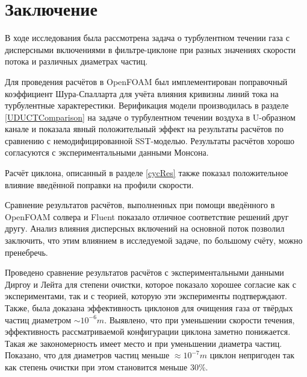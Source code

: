 \section*{Заключение}

В ходе исследования была рассмотрена задача о турбулентном течении газа с дисперсными включениями в фильтре-циклоне при разных значениях скорости потока и различных диаметрах частиц.

Для проведения расчётов в OpenFOAM был имплементирован поправочный коэффициент Шура-Спалларта для учёта влияния кривизны линий тока на турбулентные характерестики. Верификация модели производилась в разделе \ref{UDUCTComparison} на задаче о турбулентном течении воздуха в U-образном канале и показала явный положительный эффект на результаты расчётов по сравнению с немодифицированной SST-моделью. Результаты расчётов хорошо согласуются с экспериментальными данными Монсона.

Расчёт циклона, описанный в разделе \ref{cycRes} также показал положительное влияние введённой поправки на профили скорости. 

Сравнение результатов расчётов, выполненных при помощи введённого в OpenFOAM солвера и Fluent показало отличное соответствие решений друг другу. Анализ влияния дисперсных включений на основной поток позволил заключить, что этим влиянием в исследуемой задаче, по большому счёту, можно пренебречь.

Проведено сравнение результатов расчётов с экспериментальными данными Диргоу и Лейта для степени очистки, которое показало хорошее согласие как с экспериментами, так и с теорией, которую эти эксперименты подтверждают.
Также, была доказана эффективность циклонов для очищения газа от твёрдых частиц диаметром $\sim 10^{-6}m$. Выявлено, что при уменьшении скорости течения, эффективность рассматриваемой конфигурации циклона заметно понижается. Такая же закономерность имеет место и при уменьшении диаметра частиц. Показано, что для диаметров частиц меньше $\approx 10^{-7}m$ циклон непригоден так как степень очистки при этом становится меньше 30\%.